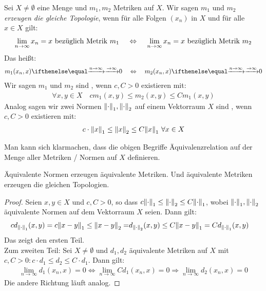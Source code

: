 \begin{Definition}{%
Sei $X \neq \emptyset$ eine Menge und $m_1,m_2$ Metriken auf $X$. 
Wir sagen $m_1$ und $m_2$ \emph{erzeugen die gleiche Topologie}, wenn für alle 
Folgen $(x_n)$ in $X$ und für alle $x\in X$ gilt:
\begin{align*}
	\lim\limits_{n \rightarrow \infty}{x_n} = x \text{ bezüglich Metrik } m_1 
	\quad \,\Leftrightarrow\, \quad \lim\limits_{n \rightarrow \infty}{ x_n = x }\text{ bezüglich 
		Metrik } m_2
\end{align*}
Das heißt: 
\begin{align*}
	m_1(x_n,x) \toinfty 0 \quad \Leftrightarrow \quad  m_2(x_n,x) \toinfty 0
\end{align*}
Wir sagen $m_1$ und $m_2$ sind , wenn $c,C > 0$ existieren mit:
\begin{align*}
	\forall x,y \in X \quad c m_1(x,y) \leq m_2(x,y) \leq C m_1(x,y) 
\end{align*}
Analog sagen wir zwei Normen $\norm{\cdot}_1, \norm{\cdot}_2$ auf einem Vektorraum 
$X$ sind , wenn $c,C > 0$ existieren mit:
\begin{align*}
	c \cdot \norm{x}_1 \leq \norm{x}_2 \leq C \norm{x}_1 \text{ } \forall x \in X
\end{align*}
}\end{Definition}

\begin{Bemerkung}{
	Man kann sich klarmachen, dass die obigen Begriffe Äquivalenzrelation auf der 
	Menge aller Metriken / Normen auf $X$ definieren.
}\end{Bemerkung}

\begin{Proposition}{%
	Äquivalente Normen erzeugen äquivalente Metriken. Und äquivalente Metriken 
	erzeugen die gleichen Topologien.
}\end{Proposition}

\begin{proof}
	Seien $x,y \in X$ und $c,C > 0$, so dass $c \norm{\cdot}_1 \leq \norm{\cdot}_2 
	\leq C \norm{\cdot}_1$, wobei $\norm{\cdot}_1, \norm{\cdot}_2$ 
	äquivalente Normen auf dem Vektorraum $X$ seien.
	Dann gilt:
	\begin{align*}
		c d_{\norm{\cdot}_1}(x,y) = c \norm{x-y}_1 \leq \norm{x-y}_2 
		= & d_{\norm{\cdot}_2}(x,y) \leq C \norm{x-y}_1 = C d_{\norm{\cdot}_1}(x,y)
	\end{align*}
	Das zeigt den ersten Teil.\\
	Zum zweiten Teil: Sei $X \neq \emptyset$ und $d_1,d_2$ äquivalente Metriken auf 
	$X$ mit \\$c,C > 0: c\cdot d_1  \leq d_2 \leq C\cdot d_1$.
	Dann gilt: 
	\begin{align*}
		\lim\limits_{n \rightarrow \infty}{d_1(x_n,x) = 0} \Leftrightarrow 
		\lim\limits_{n\rightarrow\infty}{C d_1(x_n,x) = 0}
		\Rightarrow \lim\limits_{n \rightarrow \infty}{d_2(x_n,x) = 0}
	\end{align*}
	Die andere Richtung läuft analog.
\end{proof}

